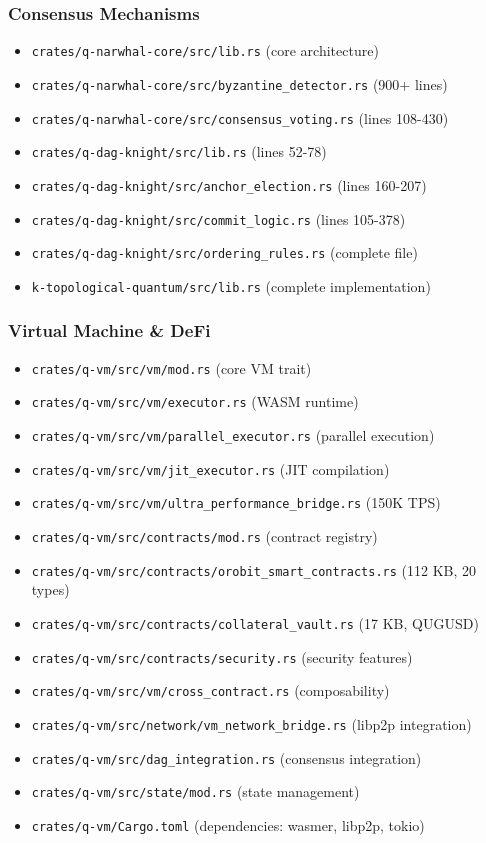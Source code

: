 \documentclass[11pt,a4paper]{article}
\begin{document}
\subsubsection{Consensus Mechanisms}
\begin{itemize}[leftmargin=*]
\item \texttt{crates/q-narwhal-core/src/lib.rs} (core architecture)
\item \texttt{crates/q-narwhal-core/src/byzantine\_detector.rs} (900+ lines)
\item \texttt{crates/q-narwhal-core/src/consensus\_voting.rs} (lines 108-430)
\item \texttt{crates/q-dag-knight/src/lib.rs} (lines 52-78)
\item \texttt{crates/q-dag-knight/src/anchor\_election.rs} (lines 160-207)
\item \texttt{crates/q-dag-knight/src/commit\_logic.rs} (lines 105-378)
\item \texttt{crates/q-dag-knight/src/ordering\_rules.rs} (complete file)
\item \texttt{k-topological-quantum/src/lib.rs} (complete implementation)
\end{itemize}

\subsubsection{Virtual Machine \& DeFi}
\begin{itemize}[leftmargin=*]
\item \texttt{crates/q-vm/src/vm/mod.rs} (core VM trait)
\item \texttt{crates/q-vm/src/vm/executor.rs} (WASM runtime)
\item \texttt{crates/q-vm/src/vm/parallel\_executor.rs} (parallel execution)
\item \texttt{crates/q-vm/src/vm/jit\_executor.rs} (JIT compilation)
\item \texttt{crates/q-vm/src/vm/ultra\_performance\_bridge.rs} (150K TPS)
\item \texttt{crates/q-vm/src/contracts/mod.rs} (contract registry)
\item \texttt{crates/q-vm/src/contracts/orobit\_smart\_contracts.rs} (112 KB, 20 types)
\item \texttt{crates/q-vm/src/contracts/collateral\_vault.rs} (17 KB, QUGUSD)
\item \texttt{crates/q-vm/src/contracts/security.rs} (security features)
\item \texttt{crates/q-vm/src/vm/cross\_contract.rs} (composability)
\item \texttt{crates/q-vm/src/network/vm\_network\_bridge.rs} (libp2p integration)
\item \texttt{crates/q-vm/src/dag\_integration.rs} (consensus integration)
\item \texttt{crates/q-vm/src/state/mod.rs} (state management)
\item \texttt{crates/q-vm/Cargo.toml} (dependencies: wasmer, libp2p, tokio)
\end{itemize}
\end{document}
